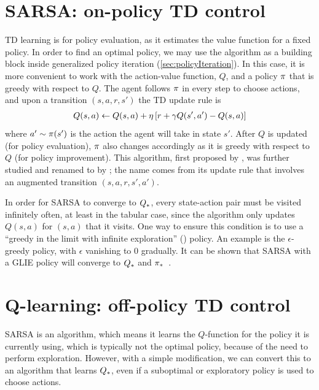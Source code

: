 \section{SARSA: on-policy TD control}
\label{sec:SARSA}

TD learning is for policy evaluation,
as it estimates the value function for a fixed policy.
In order to find an optimal policy,
we may use the algorithm as a building block inside
generalized policy iteration (\cref{sec:policyIteration}).
In this case, it is more convenient
to work with the action-value function, $Q$, and
a policy $\pi$ that is greedy with respect to $Q$.
The agent follows $\pi$ in every step
to choose actions, and upon a transition $(s,a,r,s')$
the TD update rule is
\begin{align}
Q(s,a) \leftarrow Q(s,a) + \eta \left[ r + \gamma Q(s',a') - Q(s,a) \right]
\label{eqn:rl-td-q}
\end{align}
where $a' \sim \pi(s')$ is the action
the agent will take in state $s'$.
After $Q$ is updated (for policy evaluation),
$\pi$ also changes accordingly as it is greedy
with respect to $Q$ (for policy improvement).
This algorithm, first proposed by \citep{Rummery1994},
was further studied and renamed to
 by \citep{Sutton1996};
the name comes from its update rule that
involves an augmented transition $(s,a,r,s',a')$.

In order for SARSA to converge to $Q_{*}$,
every state-action pair must be visited infinitely often,
at least in the tabular case,
since the algorithm only updates $Q(s,a)$
for $(s,a)$ that it visits.
One way to ensure this condition is to use a
``greedy in the limit with infinite exploration''
() policy.
An example is the $\epsilon$-greedy policy,
with $\epsilon$ vanishing to $0$ gradually.
It can be shown that SARSA with a GLIE policy will
converge to $Q_{*}$ and $\pi_{*}$~\citep{Singh2000}.


\section{Q-learning: off-policy TD control}
\label{sec:Qlearning}

SARSA is an  algorithm,
which means it learns the $Q$-function for the policy
it is currently using,
which is typically not the optimal policy,
because of the need to perform exploration.
However, with a simple modification,
we can convert this to an 
algorithm that learns $Q_{*}$,
even if a suboptimal or exploratory policy is used to choose actions.


